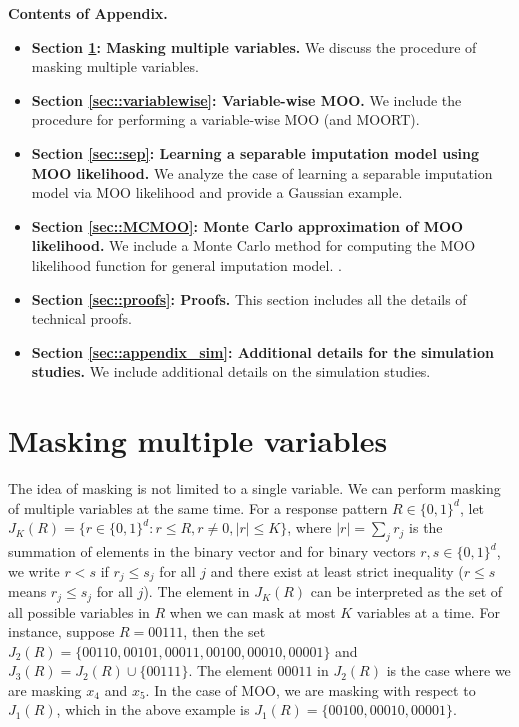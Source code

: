 \documentclass[aos, preprint]{imsart}
\theoremstyle{plain}
\theoremstyle{definition}
\begin{document}
\begin{appendix}


{\bf Contents of Appendix.}
\begin{itemize}
\item {\bf Section \ref{sec::MKO}: Masking multiple variables.}
We discuss the procedure of masking multiple variables. 

\item {\bf Section \ref{sec::variablewise}: Variable-wise MOO.}
We include the procedure for performing a variable-wise MOO (and MOORT).

\item {\bf Section \ref{sec::sep}: Learning a separable imputation model using MOO likelihood.}
We analyze the case of learning a separable imputation model via MOO likelihood and
provide a Gaussian example.

\item {\bf Section \ref{sec::MCMOO}: Monte Carlo approximation of MOO likelihood.}
We include a Monte Carlo method for computing the MOO likelihood function 
for general imputation model. .

\item {\bf Section \ref{sec::proofs}: Proofs.}
This section includes all the details of technical proofs.

\item {\bf Section \ref{sec::appendix_sim}: Additional details for the simulation studies.}
We include additional details on the simulation studies. 

\end{itemize}





\section{Masking multiple variables}	\label{sec::MKO}


The idea of masking is not limited to a single variable.
We can perform masking of multiple variables at the same time.
For a response pattern $R\in\{0,1\}^d$, let $J_K(R) = \{r\in\{0,1\}^d: r\leq  R, r\neq 0,  |r|\leq K\}$,
where $|r| = \sum_{j}r_j$ is the summation of elements in the binary vector
and for binary vectors $r,s\in\{0,1\}^d$, we write $r< s$ if $r_j\leq s_j$ for all $j$ and there exist at least strict inequality ($r\leq s$ means
$r_j\leq s_j$ for all $j$).
The element in $J_K(R)$ can be interpreted as the set of all possible variables in $R$
when we can mask at most $K$ variables at a time.
For instance, suppose $R=00111$,
then the set $J_2(R) = \{00110,  00101, 00011, 00100, 00010,00001\}$
and $J_3(R)  = J_2(R) \cup \{00111\}$.
The element $00011$ in $J_2(R)$ is the case where we are masking $x_4$ and $x_5$.
In the case of MOO, we are masking with respect to $J_1(R)$, which in the above example is $J_1(R) = \{00100, 00010, 00001\}$. 


\end{appendix}
\end{document}
